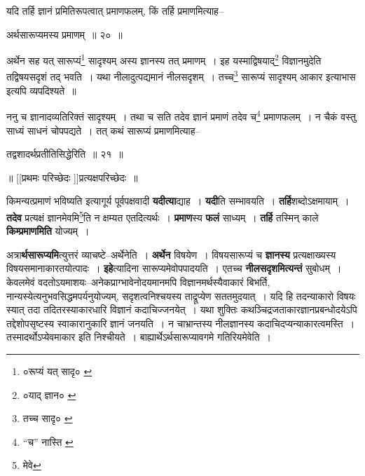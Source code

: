 \documentclass[article,12pt,a4paper]{memoir}
\begin{document}
	  \pstart यदि तर्हि ज्ञानं प्रमितिरूपत्वात् प्रमाणफलम्, किं तर्हि प्रमाणमित्याह--
	\pend
       
	  \bigskip
	  \begingroup
	

	  \pstart अर्थसारूप्यमस्य प्रमाणम् ॥ २० ॥
	\pend
      
	  \endgroup
	 

	  \pstart अर्थेन सह यत् सारूप्यं\footnote{०रूप्यं यत् सादृ० \cite{dp-msB} \cite{dp-msD}} सादृश्यम् अस्य ज्ञानस्य तत् प्रमाणम् । इह यस्माद्विषयाद्\footnote{०याद् ज्ञान० \cite{dp-msA} \cite{dp-msC} \cite{dp-edP} \cite{dp-edH} \cite{dp-edE} \cite{dp-edN}} विज्ञानमुदेति तद्विषयसदृशं तद् भवति । यथा नीलादुत्पद्यमानं नीलसदृशम् । तच्च\footnote{तच्च सादृ० \cite{dp-msA} \cite{dp-edP} \cite{dp-edE}} सारूप्यं सादृश्यम् आकार इत्याभास इत्यपि व्यपदिश्यते ॥
	\pend
       

	  \pstart ननु च ज्ञानादव्यतिरिक्तं सादृश्यम् । तथा च सति तदेव ज्ञानं प्रमाणं तदेव च\footnote{“च” नास्ति \cite{dp-msA} \cite{dp-msB} \cite{dp-msC} \cite{dp-edP} \cite{dp-edH} \cite{dp-edE} \cite{dp-edN}} प्रमाणफलम् । न चैकं वस्तु साध्यं साधनं चोपपद्यते । तत् कथं सारूप्यं प्रमाणमित्याह--
	\pend
       
	  \bigskip
	  \begingroup
	

	  \pstart तद्वशादर्थप्रतीतिसिद्धेरिति ॥ २१ ॥
	\pend
       
	    
	    \pstart
	    \begin{center}
	  ॥ [[प्रथमः परिच्छेदः \cite{dp-msB} \cite{dp-msC}]]प्रत्यक्षपरिच्छेदः ॥
	    \end{center}
	    \pend
	  
	  
	  \endgroup
	
	  \endgroup
	

	  \pstart किमन्यत्प्रमाणं भविष्यति इत्यागूर्य पूर्वपक्षवादी \textbf{यदीत्या}द्याह । \textbf{यदी}ति सम्भावयति । \textbf{तर्हि}शब्दोऽक्षमायाम् । \textbf{तदेव} प्रत्यक्षं ज्ञानमेवमि\footnote{मेवे}ति न क्षम्यत एतदित्यर्थः । \textbf{प्रमाण}स्य \textbf{फलं} साध्यम् । \textbf{तर्हि} तस्मिन् काले \textbf{किम्प्रमाणमिति} योज्यम् ।
	\pend
      

	  \pstart अत्रा\textbf{र्थसारूप्यमि}त्युत्तरं व्याचष्टे--अ\leavevmode{}र्थेनेति । \textbf{अर्थेन} विषयेण । विषयसारूप्यं च \textbf{ज्ञानस्य} प्रत्यक्षाख्यस्य विषयसमानाकारतयोत्पादः । \textbf{इहे}त्यादिना सारूप्यमेवोपपादयति । एतच्च \textbf{नीलसदृशमित्यन्तं} सुबोधम् । केवलमेवं वदतोऽयमाशयः--अनेकप्राग्भावेनोदयमानमपि विज्ञानमर्थस्यैवाकारं बिभर्ति, नान्यस्येत्यनुभवसिद्धमपर्यनुयोज्यम्, सदृशत्वनिश्चयस्य ताद्रूप्येण सततमुदयात् । यदि हि तदन्याकारो विषयः स्यात् तदा तदितरस्याकारधारि विज्ञानं कदाचिज्जनयेत् । यथा शुक्तिः कथञ्चिद्रजताकारज्ञानप्रबन्धोदयेऽपि तद्देशोपसृष्टस्य स्वाकारानुकारि ज्ञानं जनयति । न चाभ्रान्तस्य नीलज्ञानस्य कदाचिदप्यन्याकारत्वमस्ति । तस्मादर्थोऽप्येवमाकार इति निश्चीयते । बाह्यार्थेऽर्थसारूप्यावगमे गतिरियमेवेति ।
	\pend
      
\end{document}
